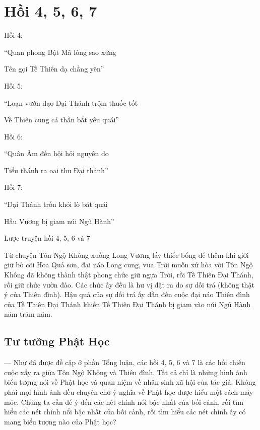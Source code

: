 \chapter{Hồi 4, 5, 6, 7} %
\label{cha:hoi_4_5_6_7}

Hồi 4:

\begin{itshape}
``Quan phong Bật Mã lòng sao xứng

Tên gọi Tề Thiên dạ chẳng yên''
\end{itshape}

Hồi 5:

\begin{itshape}
``Loạn vườn đạo Đại Thánh trộm thuốc tốt

Về Thiên cung cá thần bắt yêu quái''
\end{itshape}

Hồi 6:

\begin{itshape}
``Quân Âm đến hội hỏi nguyên do

Tiểu thánh ra oai thu Đại thánh''
\end{itshape}

Hồi 7:

\begin{itshape}
``Đại Thánh trốn khỏi lò bát quái

Hầu Vương bị giam núi Ngũ Hành''
\end{itshape}

Lược truyện hồi 4, 5, 6 và 7

Từ chuyện Tôn Ngộ Không xuống Long Vương lấy thiếc bổng để thêm khí giới giữ bờ cõi Hoa Quả sơn, đại náo Long cung, vua Trời muốn xử hòa với Tôn Ngộ Không đã không thành thật phong chức giữ ngựa Trời, rồi Tề Thiên Đại Thánh, rồi giữ chức vườn đào. Các chức ấy đều là hư vị đặt ra do sự dối trá (không thật ý của Thiên đình). Hậu quả của sự dối trá ấy dẫn đến cuộc đại náo Thiên đình của Tề Thiên Đại Thánh khiến Tề Thiên Đại Thánh bị giam vào núi Ngũ Hành năm trăm năm.

\section{Tư tưởng Phật Học} %
\label{sec:4_phat_hoc}

— Như đã được đề cập ở phần Tổng luận, các hồi 4, 5, 6 và 7 là các hồi chiến cuộc xẩy ra giữa Tôn Ngộ Không và Thiên đình. Tất cả chỉ là những hình ảnh biểu tượng nói về Phật học và quan niệm về nhân sinh xã hội của tác giả. Không phải mọi hình ảnh đều chuyên chở ý nghĩa về Phật học được hiểu một cách máy móc. Chúng ta cần để ý đến các nét chính nổi bậc nhất của bối cảnh, rồi tìm hiểu các nét chính nổi bậc nhất của bối cảnh, rồi tìm hiểu các nét chính ấy có mang biểu tượng nào của Phật học?

